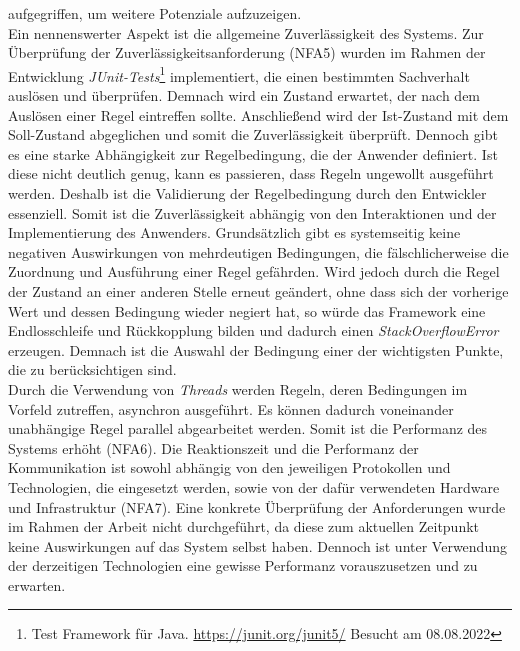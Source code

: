         aufgegriffen, um weitere Potenziale aufzuzeigen. 
        \\
        \linebreak
        Ein nennenswerter Aspekt ist die allgemeine Zuverlässigkeit des Systems. Zur Überprüfung der Zuverlässigkeitsanforderung (NFA5) wurden im Rahmen der 
        Entwicklung \textit{JUnit-Tests}\footnote{Test Framework für Java. \url{https://junit.org/junit5/} Besucht am 08.08.2022} implementiert, die 
        einen bestimmten Sachverhalt auslösen und überprüfen. Demnach wird ein Zustand erwartet, der nach dem Auslösen einer Regel eintreffen sollte. Anschließend 
        wird der Ist-Zustand mit dem Soll-Zustand abgeglichen und somit die Zuverlässigkeit überprüft. 
        Dennoch gibt es eine starke Abhängigkeit zur Regelbedingung, die der Anwender definiert. Ist diese 
        nicht deutlich genug, kann es passieren, dass Regeln ungewollt ausgeführt werden. Deshalb ist die Validierung der Regelbedingung durch den 
        Entwickler essenziell. Somit ist die Zuverlässigkeit abhängig von den Interaktionen und der Implementierung des Anwenders. Grundsätzlich gibt es 
        systemseitig keine negativen Auswirkungen von mehrdeutigen Bedingungen, die fälschlicherweise die Zuordnung und Ausführung einer Regel gefährden. Wird jedoch durch die 
        Regel der Zustand an einer anderen Stelle erneut geändert, ohne dass sich der vorherige Wert und dessen Bedingung wieder negiert hat, so würde das 
        Framework eine Endlosschleife und Rückkopplung bilden und dadurch einen \textit{StackOverflowError} erzeugen. Demnach ist die Auswahl der Bedingung einer der wichtigsten 
        Punkte, die zu berücksichtigen sind.
        \\
        \linebreak
        Durch die Verwendung von \textit{Threads} werden Regeln, deren Bedingungen im Vorfeld zutreffen, asynchron ausgeführt. Es können dadurch voneinander 
        unabhängige Regel parallel abgearbeitet werden. Somit ist die Performanz des Systems erhöht (NFA6). Die Reaktionszeit und die Performanz der 
        Kommunikation ist sowohl abhängig von den jeweiligen Protokollen und Technologien, die eingesetzt werden, sowie von der dafür verwendeten Hardware 
        und Infrastruktur (NFA7). Eine konkrete Überprüfung der Anforderungen wurde im Rahmen der Arbeit nicht durchgeführt, da diese zum aktuellen Zeitpunkt keine 
        Auswirkungen auf das System selbst haben. Dennoch ist unter Verwendung der derzeitigen Technologien eine gewisse Performanz vorauszusetzen und zu erwarten. 
